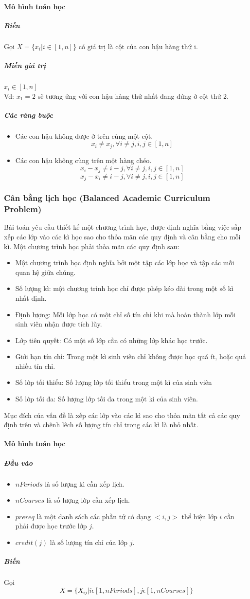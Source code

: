 \documentclass[a4paper,12pt]{report}
\begin{document}
\paragraph{Mô hình toán học}
\subparagraph{Biến}
Gọi $X=\{x_i|i \in [1,n]\}$ có giá trị là cột của con hậu hàng thứ i.
\subparagraph{Miền giá trị}
$x_i \in [1,n]$\\
 Vd:  $x_1=2$ sẽ tương ứng với con hậu hàng thứ nhất đang đứng ở cột thứ 2.
\subparagraph{Các ràng buộc}
\begin{itemize}
\item Các con hậu không được ở trên cùng một cột.
$$x_i \neq x_j,  \forall i \neq j, i,j \in [1,n] $$
\item Các con hậu không cùng trên một hàng chéo.
$$x_i-x_j \neq i-j ,\forall i \neq j, i,j \in [1,n]$$
$$x_j-x_i \neq i-j,\forall i \neq j, i,j \in [1,n]$$
\end{itemize} 
\subsubsection{Cân bằng lịch học (Balanced Academic Curriculum Problem) }
Bài toán yêu cầu thiết kế một chương trình học, được định nghĩa bằng việc sắp xếp các lớp vào các kì học sao cho thỏa mãn các quy định và cân bằng cho mỗi kì. Một chương trình học phải thỏa mãn các quy định sau:
\begin{itemize}
\item Một chương trình học định nghĩa bởi một tập các lớp học và tập các mối quan hệ giữa chúng.
\item Số lượng kì: một chương trình học chỉ được phép kéo dài trong một số kì nhất định.
\item Định lượng: Mỗi lớp học có một chỉ số tín chỉ khi mà hoàn thành lớp mỗi sinh viên nhận được tích lũy.
\item Lớp tiên quyết: Có một số lớp cần có những lớp khác học trước.
\item Giới hạn tín chỉ: Trong một kì sinh viên chỉ không được học quá ít, hoặc quá nhiều tín chỉ.
\item Số lớp tối thiểu: Số lượng lớp tối thiểu trong một kì của sinh viên
\item Số lớp tối đa: Số lượng lớp tối đa trong một kì của sinh viên.
\end{itemize}
Mục đích của vấn đề là xếp các lớp vào các kì sao cho thỏa mãn tất cả các quy định trên và  chênh lêch số lượng tín chỉ trong các kì là nhỏ nhất.\cite{csplib30}
\paragraph{Mô hình toán học}
\subparagraph{Đầu vào}
\begin{itemize}
	\item $nPeriods$ là số lượng kì cần xếp lịch.
	\item $nCourses$  là số lượng lớp cần xếp lịch.
	\item $prereq$ là một danh sách các phần tử có dạng $<i,j>$ thể hiện lớp $i$ cần phải được học trước lớp $j$.
	\item $credit(j)$ là số lượng tín chỉ của lớp $j$.
\end{itemize}
\subparagraph{Biến}
Gọi $$X= \{ X_{ij}|i\epsilon [1,nPeriods],j\epsilon [1,nCourses]  \} $$
\end{document}

